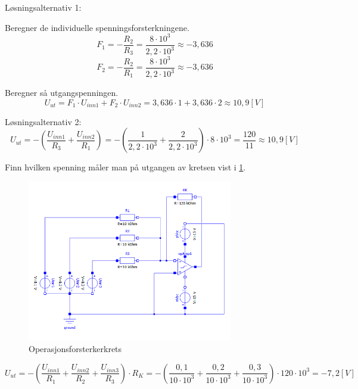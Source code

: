 \vspace{0.5cm} %

\begin{solution}[name=Løsningsforslag oppgave]
Løsningsalternativ 1:

Beregner de individuelle spenningsforsterkningene.
\[F_1=-\frac{R_2}{R_3}=\frac{8\cdot10^3}{2,2\cdot10^3} \approx -3,636\]
\[F_2=-\frac{R_2}{R_1}=\frac{8\cdot10^3}{2,2\cdot10^3} \approx -3,636\]

Beregner så utgangspenningen.
\[U_{ut}=F_1 \cdot U_{inn1}+F_2 \cdot U_{inn2}=3,636\cdot1+3,636\cdot2\approx 10,9[V]\]

Løsningsalternativ 2:
\[U_{ut}=- \left (\frac{U_{inn1}}{R_3}+\frac{U_{inn2}}{R_1} \right) = -\left (\frac{1}{2,2\cdot10^3}+\frac{2}{2,2\cdot10^3} \right) \cdot 8 \cdot10^3 = \frac{120}{11} \approx10,9[V]\]

\end{solution}
\vspace{0.5cm} %

\begin{question}[name=Oppgave, topic=operasjonsforsterker]
Finn hvilken spenning måler man på utgangen av kretsen vist i \ref{fig:sumCircuit1}.

	\begin{figure}[H]
		\centering
		\includegraphics[width=0.8\textwidth]{operasjonsforsterker/figurer/SumKrets.png}
		\caption{Operasjonsforsterkerkrets}
		\label{fig:sumCircuit1}
	\end{figure}

\end{question}

\vspace{0.5cm} %

\begin{solution}[name=Løsningsforslag oppgave]

\[U_{ut}=-\left(\frac{U_{inn1}}{R_1}+\frac{U_{inn2}}{R_2}+\frac{U_{inn3}}{R_3}\right)\cdot R_K = -\left(\frac{0,1}{10 \cdot10^3}+\frac{0,2}{10 \cdot10^3}+\frac{0,3}{10 \cdot10^3}\right)\cdot 120 \cdot 10^3 = -7,2 [V]\]

\end{solution}

\vspace{0.5cm} %